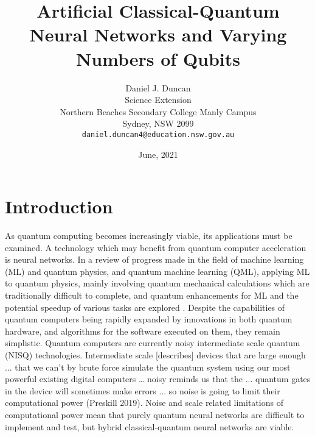 \documentclass{article}
\title{Artificial Classical-Quantum Neural Networks and Varying Numbers of Qubits}
\date{June, 2021}
\author{ {\hspace{1mm}Daniel J. Duncan} \\
	Science Extension \\
	Northern Beaches Secondary College Manly Campus \\
	Sydney, NSW 2099 \\
	\texttt{daniel.duncan4@education.nsw.gov.au} \\
}
\begin{document}
\maketitle

\begin{abstract}

\end{abstract}

\tableofcontents

\newpage
\section{Introduction}
As quantum computing becomes increasingly viable, its applications must be examined. A technology which may benefit from quantum computer acceleration is neural networks. In a review of progress made in the field of machine learning (ML) and quantum physics, and quantum machine learning (QML), applying ML to quantum physics, mainly involving quantum mechanical calculations which are traditionally difficult to complete, and quantum enhancements for ML and the potential speedup of various tasks are explored \cite{Dunjko2018}. Despite the capabilities of quantum computers being rapidly expanded by innovations in both quantum hardware, and algorithms for the software executed on them, they remain simplistic. Quantum computers are currently noisy intermediate scale quantum (NISQ) technologies. Intermediate scale [describes] devices that are large enough ... that we can't by brute force simulate the quantum system using our most powerful existing digital computers … noisy reminds us that the ... quantum gates in the device will sometimes make errors ... so noise is going to limit their computational power (Preskill 2019). Noise and scale related limitations of computational power mean that purely quantum neural networks are difficult to implement and test, but hybrid classical-quantum neural networks are viable.
\end{document}
